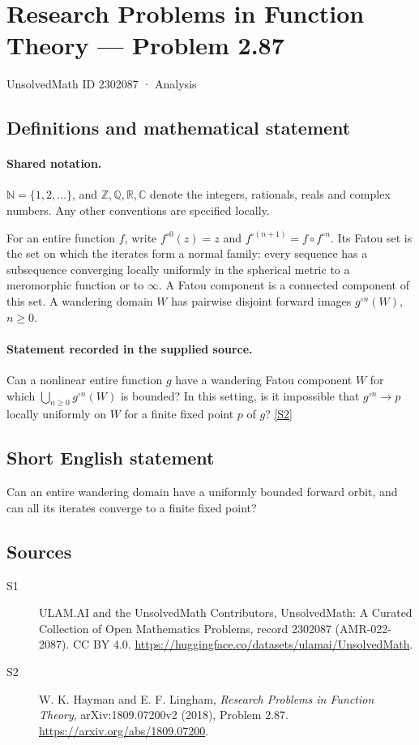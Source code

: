 \documentclass[11pt]{article}
\newcommand{\sref}[2]{\hyperlink{source:#1:#2}{[S#2]}}
\begin{document}
\setcounter{section}{2302086}
\section{Research Problems in Function Theory — Problem 2.87}\label{2302087}
{\small\sffamily UnsolvedMath ID 2302087 · Analysis}
\subsection{Definitions and mathematical statement}

\paragraph{Shared notation.}$\mathbb N=\{1,2,\ldots\}$, and $\mathbb Z,\mathbb Q,\mathbb R,\mathbb C$ denote the integers, rationals, reals and complex numbers. Any other conventions are specified locally.


For an entire function $f$, write $f^{\circ0}(z)=z$ and $f^{\circ(n+1)}=f\circ f^{\circ n}$. Its Fatou set is the set on which the iterates form a normal family: every sequence has a subsequence converging locally uniformly in the spherical metric to a meromorphic function or to $\infty$. A Fatou component is a connected component of this set. A wandering domain $W$ has pairwise disjoint forward images $g^{\circ n}(W)$, $n\geq0$.
\paragraph{Statement recorded in the supplied source.}
Can a nonlinear entire function $g$ have a wandering Fatou component $W$ for which $\bigcup_{n\geq0}g^{\circ n}(W)$ is bounded? In this setting, is it impossible that $g^{\circ n}\to p$ locally uniformly on $W$ for a finite fixed point $p$ of $g$? \sref{2302087}{2}
\subsection{Short English statement}
Can an entire wandering domain have a uniformly bounded forward orbit, and can all its iterates converge to a finite fixed point?
\subsection{Sources}
\begin{description}
\item[\hypertarget{source:2302087:1}{S1}] ULAM.AI and the UnsolvedMath Contributors, UnsolvedMath: A Curated Collection of Open Mathematics Problems, record 2302087 (AMR-022-2087). CC BY 4.0. \url{https://huggingface.co/datasets/ulamai/UnsolvedMath}.
\item[\hypertarget{source:2302087:2}{S2}] W. K. Hayman and E. F. Lingham, \emph{Research Problems in Function Theory}, arXiv:1809.07200v2 (2018), Problem 2.87. \url{https://arxiv.org/abs/1809.07200}.
\end{description}
\label{end:2302087}
\end{document}
